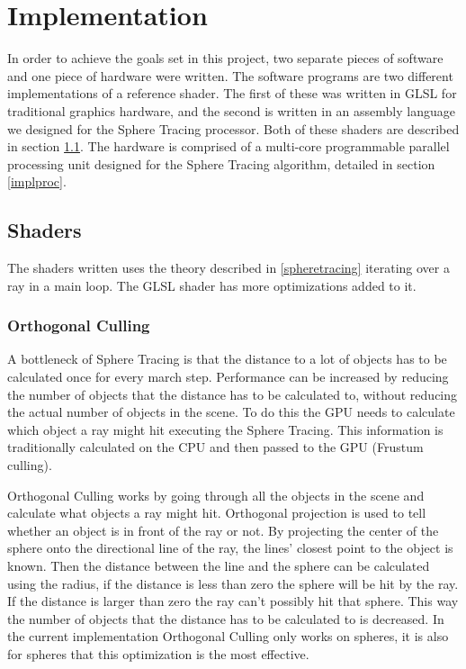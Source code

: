 \chapter{Implementation}

	In order to achieve the goals set in this project, two separate pieces of
	software and one piece of hardware were written. The software programs are
	two different implementations of a reference shader. The first of these was
	written in GLSL for traditional graphics hardware, and the second is written
	in an assembly language we designed for the Sphere Tracing processor. Both of
	these shaders are described in section \ref{implshader}.
	The hardware is comprised of a multi-core programmable parallel processing
	unit designed for the Sphere Tracing algorithm, detailed in section
	\ref{implproc}.
	
	\section{Shaders} \label{implshader}

		The shaders written uses the theory described in \ref{spheretracing}
		iterating over a ray in a main loop. The GLSL shader has more
		optimizations added to it.

		\subsection{Orthogonal Culling}

			A bottleneck of Sphere Tracing is that the distance to a lot of objects
			has to be calculated once for every march step. Performance can be
			increased by reducing the number of objects that the distance has 
			to be calculated to, without reducing the actual number of objects in the
			scene. To do this the GPU needs to calculate which object a ray might hit executing the Sphere Tracing. This information is traditionally
			calculated on the CPU and then passed to the GPU (Frustum culling).

			Orthogonal Culling works by going through all the objects in the scene
			and calculate what objects a ray might hit. Orthogonal projection is
			used to tell whether an object is in front of the ray or not. By
			projecting the center of the sphere onto the directional line of the ray,
			the lines' closest point to the object is known. Then the distance
			between the line and the sphere can be calculated using the radius, if
			the distance is less than zero the sphere will be hit by the ray. If the
			distance is larger than zero the ray can't possibly hit that sphere. This
			way the number of objects that the distance has to be calculated to is
			decreased. In the current implementation Orthogonal Culling only works on spheres, it is also for spheres that this optimization is the most effective.

